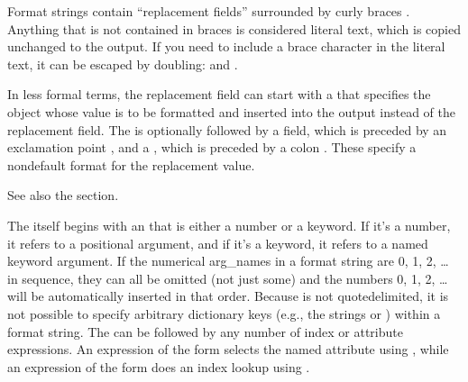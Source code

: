 \documentclass[letterpaper,10pt,english]{sphinxmanual}
\begin{document}
\ignorespaces
Format strings contain “replacement fields” surrounded by curly braces \sphinxcode{\sphinxupquote{\{\}}}.
Anything that is not contained in braces is considered literal text, which is
copied unchanged to the output.  If you need to include a brace character in the
literal text, it can be escaped by doubling: \sphinxcode{\sphinxupquote{\{\{}} and \sphinxcode{\sphinxupquote{\}\}}}.

In less formal terms, the replacement field can start with a  that specifies
the object whose value is to be formatted and inserted
into the output instead of the replacement field.
The  is optionally followed by a   field, which is
preceded by an exclamation point \sphinxcode{\sphinxupquote{\textquotesingle{}!\textquotesingle{}}}, and a , which is preceded
by a colon \sphinxcode{\sphinxupquote{\textquotesingle{}:\textquotesingle{}}}.  These specify a non\sphinxhyphen{}default format for the replacement value.

See also the {\hyperref[\detokenize{string:formatspec}]{}} section.

The  itself begins with an  that is either a number or a
keyword.  If it’s a number, it refers to a positional argument, and if it’s a keyword,
it refers to a named keyword argument.  If the numerical arg\_names in a format string
are 0, 1, 2, … in sequence, they can all be omitted (not just some)
and the numbers 0, 1, 2, … will be automatically inserted in that order.
Because  is not quote\sphinxhyphen{}delimited, it is not possible to specify arbitrary
dictionary keys (e.g., the strings \sphinxcode{\sphinxupquote{\textquotesingle{}10\textquotesingle{}}} or \sphinxcode{\sphinxupquote{\textquotesingle{}:\sphinxhyphen{}{]}\textquotesingle{}}}) within a format string.
The  can be followed by any number of index or
attribute expressions. An expression of the form  selects the named
attribute using , while an expression of the form \sphinxcode{\sphinxupquote{\textquotesingle{}{[}index{]}\textquotesingle{}}}
does an index lookup using .
\end{document}
